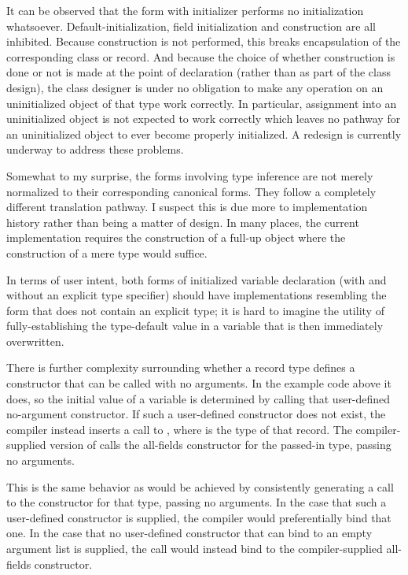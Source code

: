 It can be observed that the form with  initializer performs no
initialization whatsoever.  Default-initialization, field initialization and construction are
all inhibited.  Because construction is not performed, this breaks encapsulation of the
corresponding class or record.  And because the choice of whether construction is done or
not is made at the point of declaration (rather than as part of the class design), the
class designer is under no obligation to make any operation on an uninitialized object of
that type work correctly.  In particular, assignment into an uninitialized object is
not expected to work correctly which leaves no pathway for an uninitialized
object to ever become properly initialized.  A redesign is currently underway to address
these problems.

Somewhat to my surprise, the forms involving type inference are not merely normalized
to their corresponding canonical forms.  They follow a completely different translation
pathway.  I suspect this is due more to implementation history rather than being a matter
of design.  In many places, the current implementation requires the construction of a
full-up object where the construction of a mere type would suffice.  

In terms of user intent, both forms of initialized variable declaration (with and without
an explicit type specifier) should have implementations resembling the
form that does not contain an explicit type; it is hard to imagine the utility of
fully-establishing the type-default value in a variable that is then immediately overwritten.

There is further complexity surrounding whether a record type defines a constructor that
can be called with no arguments.  In the example code above it does, so the initial value of
a  variable is determined by calling that user-defined no-argument
constructor.  If such a user-defined constructor does not exist, the compiler instead
inserts a call to , where  is the type of that record.  The
compiler-supplied version of  calls the all-fields constructor for the
passed-in type, passing no arguments.  

This is the same behavior as would be achieved by consistently generating a call to the
constructor for that type, passing no arguments.  
In the case that such a user-defined
constructor is supplied, the compiler would preferentially bind that one.
In the case that no user-defined
constructor that can bind to an empty argument list is supplied, the call would instead bind to
the compiler-supplied all-fields constructor.  

